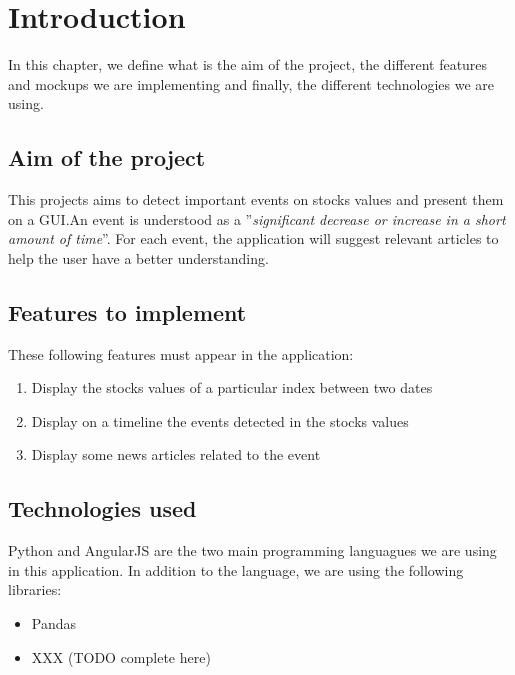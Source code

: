 \chapter{Introduction}
\label{chapter:introduction}
In this chapter, we define what is the aim of the project, the different features and mockups we are implementing and finally, the different technologies we are using.

\section{Aim of the project}
This projects aims to detect important events on stocks values and present them on a GUI.\@ An event is understood as a ''\textit{significant decrease or increase in a short amount of time}''. For each event, the application will suggest relevant articles to help the user have a better understanding.

\section{Features to implement}
These following features must appear in the application:
\begin{enumerate}
    \item Display the stocks values of a particular index between two dates
    \item Display on a timeline the events detected in the stocks values
    \item Display some news articles related to the event
\end{enumerate}

\section{Technologies used}
Python and AngularJS are the two main programming languagues we are using in this application. In addition to the language, we are using the following libraries:
\begin{itemize}
    \item Pandas
    \item XXX (TODO complete here)
\end{itemize}

